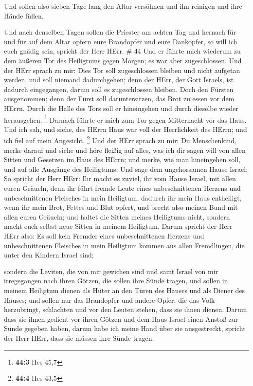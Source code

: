  Und sollen also sieben Tage lang den Altar versöhnen und
ihn reinigen und ihre Hände füllen.

 Und nach denselben Tagen sollen die Priester am achten Tag
und hernach für und für auf dem Altar opfern eure Brandopfer und eure
Dankopfer, so will ich euch gnädig sein, spricht der Herr HErr. \# 44
 Und er führte mich wiederum zu dem äußeren Tor des
Heiligtums gegen Morgen; es war aber zugeschlossen.  Und der
HErr sprach zu mir: Dies Tor soll zugeschlossen bleiben und nicht
aufgetan werden, und soll niemand dadurchgehen; denn der HErr, der Gott
Israels, ist dadurch eingegangen, darum soll es zugeschlossen bleiben.
 Doch den Fürsten ausgenommen; denn der Fürst soll
daruntersitzen, das Brot zu essen vor dem HErrn. Durch die Halle des
Tors soll er hineingehen und durch dieselbe wieder herausgehen.
\footnote{\textbf{44:3} Hes 45,7}  Darnach führte er mich
zum Tor gegen Mitternacht vor das Haus. Und ich sah, und siehe, des
HErrn Haus war voll der Herrlichkeit des HErrn; und ich fiel auf mein
Angesicht. \footnote{\textbf{44:4} Hes 43,5}  Und der HErr
sprach zu mir: Du Menschenkind, merke darauf und siehe und höre fleißig
auf alles, was ich dir sagen will von allen Sitten und Gesetzen im Haus
des HErrn; und merke, wie man hineingehen soll, und auf alle Ausgänge
des Heiligtums.  Und sage dem ungehorsamen Hause Israel: So
spricht der Herr HErr: Ihr macht es zuviel, ihr vom Hause Israel, mit
allen euren Gräueln,  denn ihr führt fremde Leute eines
unbeschnittenen Herzens und unbeschnittenen Fleisches in mein Heiligtum,
dadurch ihr mein Haus entheiligt, wenn ihr mein Brot, Fettes und Blut
opfert, und brecht also meinen Bund mit allen euren Gräueln;
 und haltet die Sitten meines Heiligtums nicht, sondern
macht euch selbst neue Sitten in meinem Heiligtum.  Darum
spricht der Herr HErr also: Es soll kein Fremder eines unbeschnittenen
Herzens und unbeschnittenen Fleisches in mein Heiligtum kommen aus allen
Fremdlingen, die unter den Kindern Israel sind;

 sondern die Leviten, die von mir gewichen sind und samt
Israel von mir irregegangen nach ihren Götzen, die sollen ihre Sünde
tragen,  und sollen in meinem Heiligtum dienen als Hüter an
den Türen des Hauses und als Diener des Hauses; und sollen nur das
Brandopfer und andere Opfer, die das Volk herzubringt, schlachten und
vor den Leuten stehen, dass sie ihnen dienen.  Darum dass
sie ihnen gedient vor ihren Götzen und dem Haus Israel einen Anstoß zur
Sünde gegeben haben, darum habe ich meine Hand über sie ausgestreckt,
spricht der Herr HErr, dass sie müssen ihre Sünde tragen.

